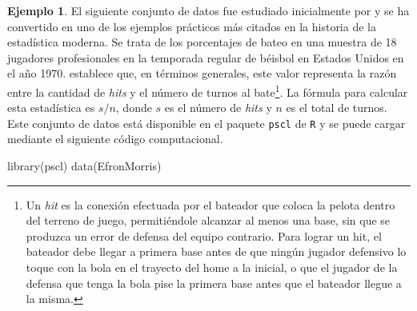\documentclass[
  12pt,
  spanish,
]{book}
\newenvironment{Shaded}{\begin{snugshade}}{\end{snugshade}}
\newcommand{\FunctionTok}[1]{\textcolor[rgb]{0.00,0.00,0.00}{#1}}
\newcommand{\NormalTok}[1]{#1}
\theoremstyle{definition}
\theoremstyle{definition}
\newtheorem{example}{Ejemplo}[chapter]
\theoremstyle{definition}
\theoremstyle{definition}
\theoremstyle{remark}
\begin{document}
\begin{example}
\protect\hypertarget{exm:unnamed-chunk-23}{}{\label{exm:unnamed-chunk-23} }El siguiente conjunto de datos fue estudiado inicialmente por \citet{Efron75} y se ha convertido en uno de los ejemplos prácticos más citados en la historia de la estadística moderna. Se trata de los porcentajes de bateo en una muestra de 18 jugadores profesionales en la temporada regular de béisbol en Estados Unidos en el año 1970. \citet{wikiBat} establece que, en términos generales, este valor representa la razón entre la cantidad de \emph{hits} y el número de turnos al bate\footnote{Un \emph{hit} es la conexión efectuada por el bateador que coloca la pelota dentro del terreno de juego, permitiéndole alcanzar al menos una base, sin que se produzca un error de defensa del equipo contrario. Para lograr un hit, el bateador debe llegar a primera base antes de que ningún jugador defensivo lo toque con la bola en el trayecto del home a la inicial, o que el jugador de la defensa que tenga la bola pise la primera base antes que el bateador llegue a la misma.}. La fórmula para calcular esta estadística es \(s/n\), donde \(s\) es el número de \emph{hits} y \(n\) es el total de turnos. Este conjunto de datos está disponible en el paquete \texttt{pscl} de \texttt{R} y se puede cargar mediante el siguiente código computacional.
\end{example}

\begin{Shaded}
\begin{Highlighting}[]
\FunctionTok{library}\NormalTok{(pscl)}
\FunctionTok{data}\NormalTok{(EfronMorris)}
\end{Highlighting}
\end{Shaded}
\end{document}
